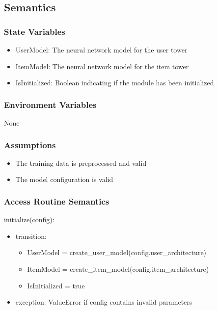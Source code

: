 \documentclass[12pt, titlepage]{article}
\begin{document}
\subsection{Semantics}

\subsubsection{State Variables}
\begin{itemize}
  \item UserModel: The neural network model for the user tower
  \item ItemModel: The neural network model for the item tower
  \item IsInitialized: Boolean indicating if the module has been initialized
\end{itemize}

\subsubsection{Environment Variables}

None

\subsubsection{Assumptions}

\begin{itemize}
  \item The training data is preprocessed and valid
  \item The model configuration is valid
\end{itemize}

\subsubsection{Access Routine Semantics}

\noindent initialize(config):
\begin{itemize}
\item transition:
\begin{itemize}
  \item UserModel = create\_user\_model(config.user\_architecture)
  \item ItemModel = create\_item\_model(config.item\_architecture)
  \item IsInitialized = true
\end{itemize}
\item exception: ValueError if config contains invalid parameters
\end{itemize}
\end{document}
